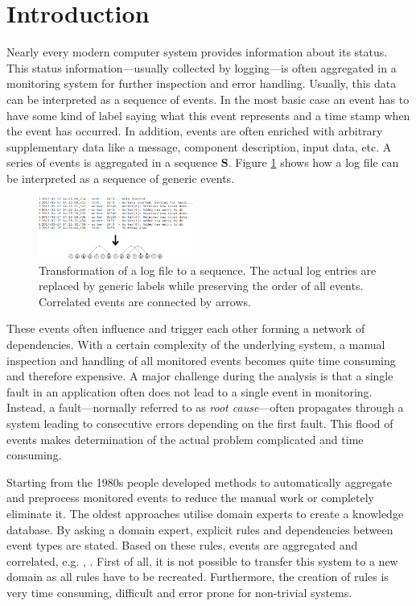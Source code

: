 \documentclass[conference]{IEEEtran}
\theoremstyle{examplestyle}
\begin{document}
\IEEEpeerreviewmaketitle



\section{Introduction}
Nearly every modern computer system provides information about its status. This status information---usually collected by logging---is often aggregated in a monitoring system for further inspection and error handling. Usually, this data can be interpreted as a sequence of events. In the most basic case an event has to have some kind of label saying what this event represents and a time stamp when the event has occurred. In addition, events are often enriched with arbitrary supplementary data like a message, component description, input data, etc. A series of events is aggregated in a sequence \(\pmb{S}\). Figure \ref{fig:logToSequence} shows how a log file can be interpreted as a sequence of generic events.

\begin{figure}[!htb]
	\centering
	\includegraphics[width=0.45\textwidth]{images/overview.png}
	\caption{Transformation of a log file to a sequence. The actual log entries are replaced by generic labels while preserving the order of all events. Correlated events are connected by arrows.}
	\label{fig:logToSequence}
\end{figure}

These events often influence and trigger each other forming a network of dependencies. With a certain complexity of the underlying system, a manual inspection and handling of all monitored events becomes quite time consuming and therefore expensive. A major challenge during the analysis is that a single fault in an application often does not lead to a single event in monitoring. Instead, a fault---normally referred to as \textit{root cause}---often propagates through a system leading to consecutive errors depending on the first fault. This flood of events makes determination of the actual problem complicated and time consuming.

Starting from the 1980s people developed methods to automatically aggregate and preprocess monitored events to reduce the manual work or completely eliminate it. The oldest approaches utilise domain experts to create a knowledge database. By asking a domain expert, explicit rules and dependencies between event types are stated. Based on these rules, events are aggregated and correlated, e.g. \cite{Houck1995}, \cite{Kettschau2002}. First of all, it is not possible to transfer this system to a new domain as all rules have to be recreated. Furthermore, the creation of rules is very time consuming, difficult and error prone for non-trivial systems.
\end{document}

